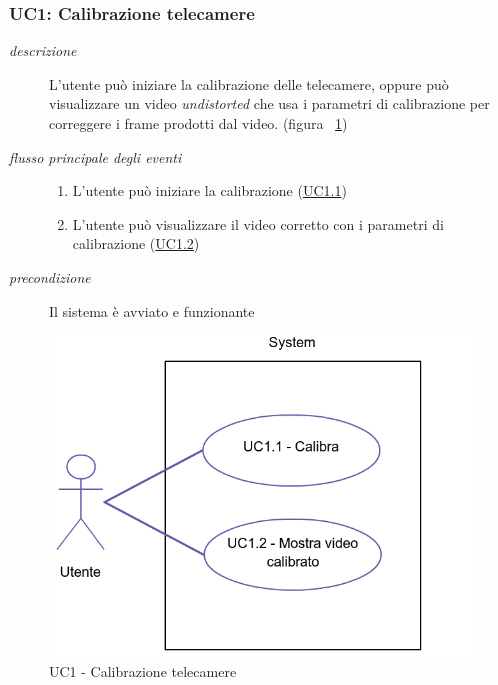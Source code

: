 \subsubsection{UC1: Calibrazione telecamere} \label{sec:UC1}
\begin{description}
\item[\em{descrizione }]L'utente può iniziare la calibrazione delle telecamere, oppure può visualizzare un video \textit{undistorted} che usa i parametri di calibrazione per correggere i frame prodotti dal video. (figura ~\ref{fig:uc1})
\item[\em{flusso principale degli eventi }] \mbox{}
\begin{enumerate}
\item L'utente può iniziare la calibrazione (\hyperref[sec:uc1.1]{UC1.1}) 
\item L'utente può visualizzare il video corretto con i parametri di calibrazione (\hyperref[sec:uc1.2]{UC1.2})
\end{enumerate}
\item[\em{precondizione }] Il sistema è avviato e funzionante
\end{description}

\begin{figure}[htpb] 
\centering 
\includegraphics[scale=0.4]{./images/uc1.png} 
\caption{UC1 - Calibrazione telecamere} 
\label{fig:uc1}
\end{figure} 

